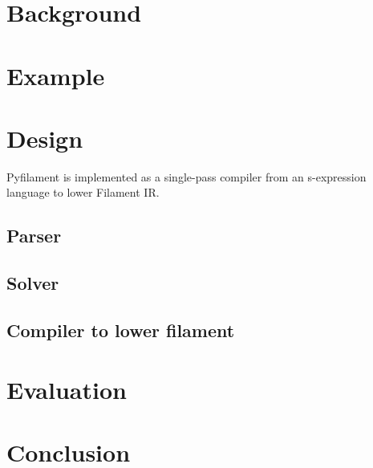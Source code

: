 \documentclass[12pt,a4paper]{article}
\begin{document}
\section{Background}

\section{Example}

\section{Design}
Pyfilament is implemented as a single-pass compiler from an s-expression language to lower Filament IR.

\subsection{Parser}

\subsection{Solver}

\subsection{Compiler to lower filament}

\section{Evaluation}

\section{Conclusion}



\medskip

\printbibliography
\end{document}
